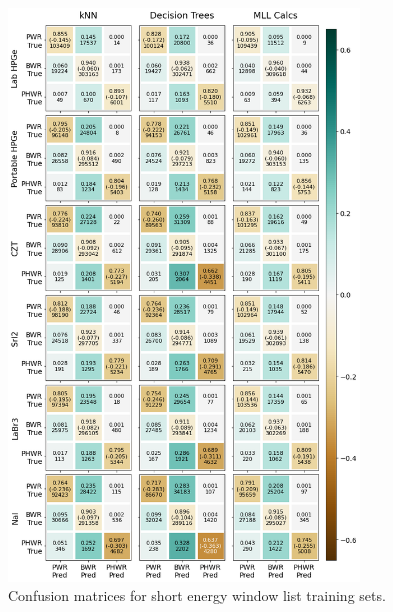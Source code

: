 \begin{figure}[!htbp]
  \centering
  \includegraphics[width=0.83\textwidth]{./chapters/exp2/confusion_matrix_6dets_short.png}
  \caption{Confusion matrices for short energy window list training sets.}
  \label{fig:cm_short}
\end{figure}

